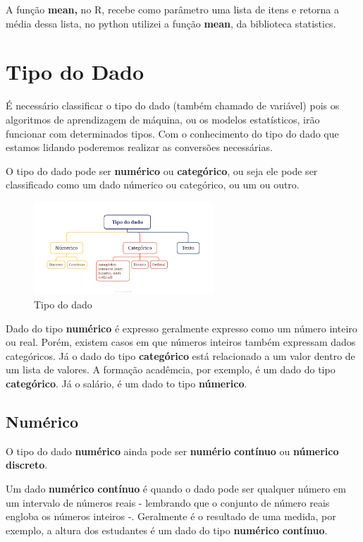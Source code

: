 \documentclass[
]{book}
\begin{document}
A função \textbf{mean,} no R, recebe como parâmetro uma lista de itens e retorna a média dessa lista, no python utilizei a função \textbf{mean}, da biblioteca statistics.

\hypertarget{tipo-do-dado}{%
\section{Tipo do Dado}\label{tipo-do-dado}}

É necessário classificar o tipo do dado (também chamado de variável) pois os algoritmos de aprendizagem de máquina, ou os modelos estatísticos, irão funcionar com determinados tipos. Com o conhecimento do tipo do dado que estamos lidando poderemos realizar as conversões necessárias.

O tipo do dado pode ser \textbf{numérico} ou \textbf{categórico}, ou seja ele pode ser classificado como um dado númerico ou categórico, ou um ou outro.

\begin{figure}
\centering
\includegraphics[width=2.64583in,height=\textheight]{figuras/tipo_dado.png}
\caption{Tipo do dado}
\end{figure}

Dado do tipo \textbf{numérico} é expresso geralmente expresso como um número inteiro ou real. Porém, existem casos em que números inteiros também expressam dados categóricos. Já o dado do tipo \textbf{categórico} está relacionado a um valor dentro de um lista de valores. A formação acadêmcia, por exemplo, é um dado do tipo \textbf{categórico}. Já o salário, é um dado to tipo \textbf{númerico}.

\hypertarget{numuxe9rico}{%
\subsection{Numérico}\label{numuxe9rico}}

O tipo do dado \textbf{numérico} ainda pode ser \textbf{numério} \textbf{contínuo} ou \textbf{númerico} \textbf{discreto}.

Um dado \textbf{numérico} \textbf{contínuo} é quando o dado pode ser qualquer número em um intervalo de números reais - lembrando que o conjunto de número reais engloba os números inteiros -. Geralmente é o resultado de uma medida, por exemplo, a altura dos estudantes é um dado do tipo \textbf{numérico} \textbf{contínuo}.
\end{document}
